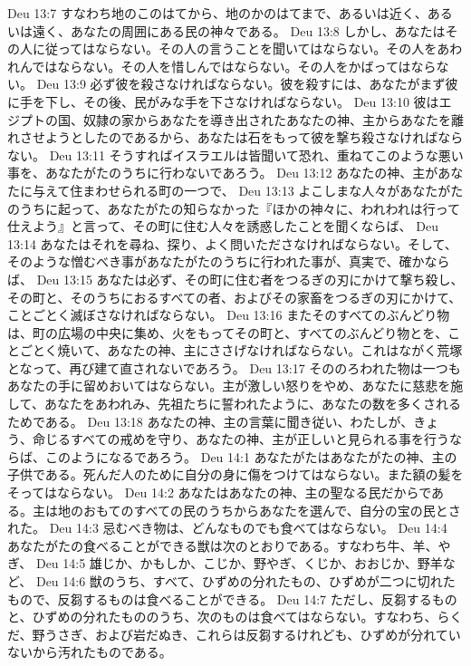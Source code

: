 Deu 13:7  すなわち地のこのはてから、地のかのはてまで、あるいは近く、あるいは遠く、あなたの周囲にある民の神々である。
Deu 13:8  しかし、あなたはその人に従ってはならない。その人の言うことを聞いてはならない。その人をあわれんではならない。その人を惜しんではならない。その人をかばってはならない。
Deu 13:9  必ず彼を殺さなければならない。彼を殺すには、あなたがまず彼に手を下し、その後、民がみな手を下さなければならない。
Deu 13:10  彼はエジプトの国、奴隷の家からあなたを導き出されたあなたの神、主からあなたを離れさせようとしたのであるから、あなたは石をもって彼を撃ち殺さなければならない。
Deu 13:11  そうすればイスラエルは皆聞いて恐れ、重ねてこのような悪い事を、あなたがたのうちに行わないであろう。
Deu 13:12  あなたの神、主があなたに与えて住まわせられる町の一つで、
Deu 13:13  よこしまな人々があなたがたのうちに起って、あなたがたの知らなかった『ほかの神々に、われわれは行って仕えよう』と言って、その町に住む人々を誘惑したことを聞くならば、
Deu 13:14  あなたはそれを尋ね、探り、よく問いたださなければならない。そして、そのような憎むべき事があなたがたのうちに行われた事が、真実で、確かならば、
Deu 13:15  あなたは必ず、その町に住む者をつるぎの刃にかけて撃ち殺し、その町と、そのうちにおるすべての者、およびその家畜をつるぎの刃にかけて、ことごとく滅ぼさなければならない。
Deu 13:16  またそのすべてのぶんどり物は、町の広場の中央に集め、火をもってその町と、すべてのぶんどり物とを、ことごとく焼いて、あなたの神、主にささげなければならない。これはながく荒塚となって、再び建て直されないであろう。
Deu 13:17  そののろわれた物は一つもあなたの手に留めおいてはならない。主が激しい怒りをやめ、あなたに慈悲を施して、あなたをあわれみ、先祖たちに誓われたように、あなたの数を多くされるためである。
Deu 13:18  あなたの神、主の言葉に聞き従い、わたしが、きょう、命じるすべての戒めを守り、あなたの神、主が正しいと見られる事を行うならば、このようになるであろう。
Deu 14:1  あなたがたはあなたがたの神、主の子供である。死んだ人のために自分の身に傷をつけてはならない。また額の髪をそってはならない。
Deu 14:2  あなたはあなたの神、主の聖なる民だからである。主は地のおもてのすべての民のうちからあなたを選んで、自分の宝の民とされた。
Deu 14:3  忌むべき物は、どんなものでも食べてはならない。
Deu 14:4  あなたがたの食べることができる獣は次のとおりである。すなわち牛、羊、やぎ、
Deu 14:5  雄じか、かもしか、こじか、野やぎ、くじか、おおじか、野羊など、
Deu 14:6  獣のうち、すべて、ひずめの分れたもの、ひずめが二つに切れたもので、反芻するものは食べることができる。
Deu 14:7  ただし、反芻するものと、ひずめの分れたもののうち、次のものは食べてはならない。すなわち、らくだ、野うさぎ、および岩だぬき、これらは反芻するけれども、ひずめが分れていないから汚れたものである。
